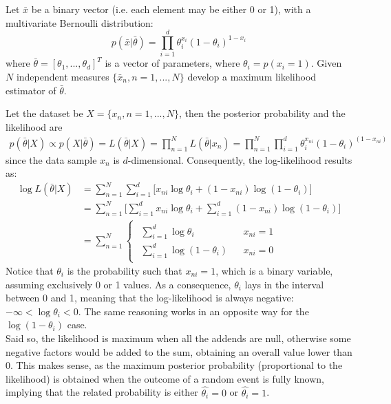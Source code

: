 \Exercise[number={9}]
Let \(\bar{x}\) be a binary vector (i.e. each element may be either 0 or 1), with a
multivariate Bernoulli distribution:
\[
    p(\bar{x}|\bar{\theta})=\prod_{i=1}^{d}\theta_i^{x_i}(1-\theta_i)^{1-x_i}
\]
where \(\bar{\theta}=[\theta_1,...,\theta_d]^T\) is a vector of parameters,
where \(\theta_i = p(x_i=1)\). Given \(N\) independent measures
\(\bigl\{ \bar{x}_n, n=1,...,N \bigr\}\) develop a maximum likelihood
estimator of \(\bar{\theta}\).

\Answer[number={9}]
Let the dataset be \(X=\{x_n, n=1,...,N\}\), then the posterior probability
and the likelihood are
\begin{align*}
    p(\bar{\theta}|X) \propto p(X|\bar{\theta})
    =
    L(\bar{\theta}|X) = \prod_{n=1}^{N}L(\bar{\theta}|x_n)
    =
    \prod_{n=1}^{N} \prod_{i=1}^{d} \theta_i^{x_{ni}}(1-\theta_i)^{(1-x_{ni})}
\end{align*}
since the data sample \(x_n\) is \(d\)-dimensional.
Consequently, the log-likelihood results as:
\begin{align*}
    \log{L(\bar{\theta}|X)}
    &=
    \sum_{n=1}^{N}\sum_{i=1}^{d} \biggl[x_{ni}\log{\theta_i}+(1-x_{ni})\log{(1-\theta_i)}\biggr] \\  
    &=
    \sum_{n=1}^{N}\biggl[\sum_{i=1}^{d}x_{ni}\log{\theta_i}+\sum_{i=1}^{d}(1-x_{ni})\log{(1-\theta_i)}\biggr] \\
    &=
    \sum_{n=1}^{N}
    \begin{cases}
        \begin{matrix}
            \sum_{i=1}^{d}\log{\theta_i} && x_{ni} = 1 \\
            \sum_{i=1}^{d}\log{(1-\theta_i)} && x_{ni} = 0
        \end{matrix}
    \end{cases}
\end{align*}
Notice that \(\theta_i\) is the probability such that \(x_{ni}=1\), which is
a binary variable, assuming exclusively 0 or 1 values. As a consequence,
\(\theta_i\) lays in the interval between 0 and 1, meaning that the log-likelihood
is always negative: \(-\infty<\log{\theta_i}<0\). The same reasoning
works in an opposite way for the \(\log{(1-\theta_i)}\) case. \\
Said so, the likelihood is maximum when all the addends are null, otherwise
some negative factors would be added to the sum, obtaining an overall value
lower than 0. This makes sense, as the maximum posterior probability
(proportional to the likelihood) is obtained when the outcome of a random event
is fully known, implying that the related probability is either
\(\hat{\theta_i}=0\) or \(\hat{\theta_i}=1\).
